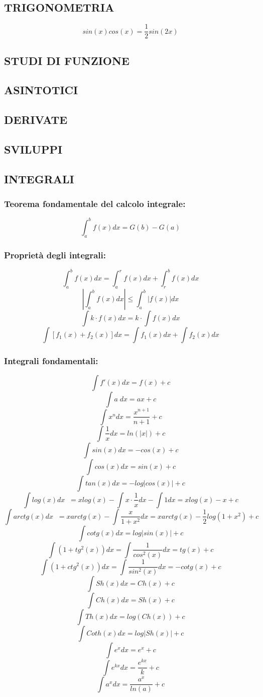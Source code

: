 \documentclass[a4paper, 9pt]{report}
\begin{document}
\subsection*{TRIGONOMETRIA}
\[
    sin(x) cos(x) = \frac{1}{2}sin(2x)
\]
\subsection*{STUDI DI FUNZIONE}
\subsection*{ASINTOTICI}
\subsection*{DERIVATE}
\subsection*{SVILUPPI}
\subsection*{INTEGRALI}
\subsubsection*{Teorema fondamentale del calcolo integrale:}
\[
    \int_{a}^{b} f(x) dx = G(b) - G(a)
\]
\subsubsection*{Proprietà degli integrali:}
\[
    \int_{a}^{b} f(x)dx = \int_{a}^{r} f(x) dx + \int_{r}^{b} f(x) dx
\]
\[
    \left| \int_{a}^{b} f(x) dx \right| \leq \int_{a}^{b} |f(x)| dx
\]
\[
    \int k \cdot f(x) dx = k \cdot \int f(x) dx
\]
\[
    \int [f_1(x) + f_2(x) ] dx= \int f_1(x) dx + \int f_2(x) dx
\]
\subsubsection*{Integrali fondamentali:}
\[
    \int f'(x) dx = f(x) +c
\]
\[
    \int a \; dx = ax +c
\]
\[
    \int x^n dx = \frac{x^{n+1}}{n+1} +c
\]
\[
    \int \frac{1}{x}dx = ln(|x|) +c
\]
\[
    \int sin(x) dx = -cos(x) +c
\]
\[
    \int cos(x) dx = sin(x)+c
\]
\[
    \int tan(x) dx = -log|cos(x)| +c
\]
\[
    \int log(x) dx \;\; = xlog(x) - \int x \cdot  \frac{1}{x} dx - \int 1 dx = x log(x) -x + c
\]
\[
    \int arctg (x) dx \;\; = x arctg(x) -\int \frac{x}{1+x^2}dx = x arctg(x) -\frac{1}{2}log(1+x^2) + c 
\]
\[
    \int cotg(x) dx = log|sin(x)| +c
\]
\[
    \int (1+tg^2(x))dx = \int \frac{1}{cos^2(x)} dx = tg(x) +c
\]
\[
    \int (1+ctg^2(x))dx = \int \frac{1}{sin^2(x)} dx = -cotg(x) +c
\]
\[
    \int Sh(x) dx = Ch(x) +c
\]
\[
    \int Ch(x) dx = Sh(x) +c
\]
\[
    \int Th(x) dx = log(Ch(x))+c
\]
\[
    \int Coth(x) dx = log|Sh(x)| +c
\]
\[
    \int e^x dx = e^x+c
\]
\[
    \int e^{kx} dx = \frac{e^{kx}}{k} +c
\]
\[
    \int a^x dx = \frac{a^x}{ln(a)}+c
\]
\end{document}
